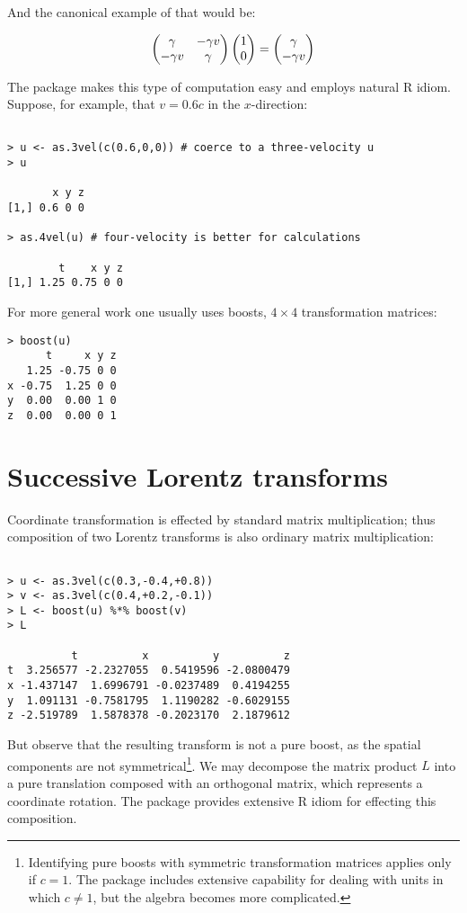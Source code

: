 \documentclass[ijoc,nonblindrev]{informs3} %
\begin{document}
And the canonical example of that would be:

\begin{equation*}
\begin{pmatrix} \gamma & -\gamma v \\ -\gamma
  v & \gamma\end{pmatrix}\begin{pmatrix}1 \\ 0\end{pmatrix}=\begin{pmatrix}\gamma \\ -\gamma v\end{pmatrix}
\end{equation*}

The package makes this type of computation easy and employs natural R
idiom.  Suppose, for example, that $v=0.6c$ in the $x$-direction:

\begin{verbatim}

> u <- as.3vel(c(0.6,0,0)) # coerce to a three-velocity u
> u

       x y z 
[1,] 0.6 0 0

> as.4vel(u) # four-velocity is better for calculations

        t    x y z
[1,] 1.25 0.75 0 0

\end{verbatim}

For more general work one usually uses boosts, $4\times 4$
transformation matrices:

\begin{verbatim}
> boost(u)
      t     x y z
   1.25 -0.75 0 0 
x -0.75  1.25 0 0 
y  0.00  0.00 1 0 
z  0.00  0.00 0 1

\end{verbatim}

\section{Successive Lorentz transforms}

Coordinate transformation is effected by standard matrix
multiplication; thus composition of two Lorentz transforms is also
ordinary matrix multiplication:

\begin{verbatim}

> u <- as.3vel(c(0.3,-0.4,+0.8))
> v <- as.3vel(c(0.4,+0.2,-0.1))
> L <- boost(u) %*% boost(v)
> L

          t          x          y          z
t  3.256577 -2.2327055  0.5419596 -2.0800479
x -1.437147  1.6996791 -0.0237489  0.4194255
y  1.091131 -0.7581795  1.1190282 -0.6029155
z -2.519789  1.5878378 -0.2023170  2.1879612

\end{verbatim}

But observe that the resulting transform is not a pure boost, as the
spatial components are not symmetrical\footnote{Identifying pure
  boosts with symmetric transformation matrices applies only if $c=1$.
  The package includes extensive capability for dealing with units in
  which $c\neq 1$, but the algebra becomes more complicated.}.  We may
decompose the matrix product $L$ into a pure translation composed with
an orthogonal matrix, which represents a coordinate rotation.  The
package provides extensive R idiom for effecting this composition.
\end{document}
